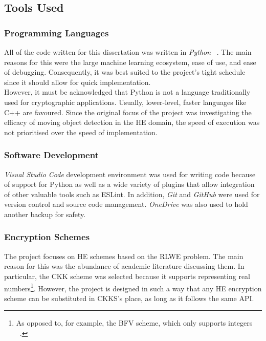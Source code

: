 \setlength{\leftskip}{0cm}

\subsection{Tools Used}
\subsubsection{Programming Languages}
\setlength{\leftskip}{0.5cm}
\indent \indent
All of the code written for this dissertation was written in \textit{Python} ~\cite{Python}.  The main reasons for this were the large machine learning ecosystem, ease of use, and ease of debugging. Consequently, it was best suited to the project's tight schedule since it should allow for quick implementation.
\smallskip \\ \indent
However, it must be acknowledged that Python is not a language traditionally used for cryptographic applications. Usually, lower-level, faster languages like C++ are favoured. Since the original focus of the project was investigating the efficacy of moving object detection in the HE domain, the speed of execution was not prioritised over the speed of implementation.

\setlength{\leftskip}{0cm}
\subsubsection{Software Development}
\setlength{\leftskip}{0.5cm}
\indent \indent
\textit{Visual Studio Code} \cite{VSCode} development environment was used for writing code because of support for Python as well as a wide variety of plugins that allow integration of other valuable tools such as ESLint.  In addition, \textit{Git} \cite{Git} and \textit{GitHub} \cite{Github} were used for version control and source code management. \textit{OneDrive} \cite{OneDrive} was also used to hold another backup for safety.

\setlength{\leftskip}{0cm}
\subsubsection{Encryption Schemes}
\setlength{\leftskip}{0.5cm}
\indent \indent
The project focuses on HE schemes based on the RLWE problem. The main reason for this was the abundance of academic literature discussing them. In particular, the CKK scheme \cite{CKKS} was selected because it supports representing real numbers\footnote{As opposed to, for example, the BFV scheme, which only supports integers ~\cite{BFV1, BFV2}.}. However, the project is designed in such a way that any HE encryption scheme can be substituted in CKKS's place, as long as it follows the same API.

